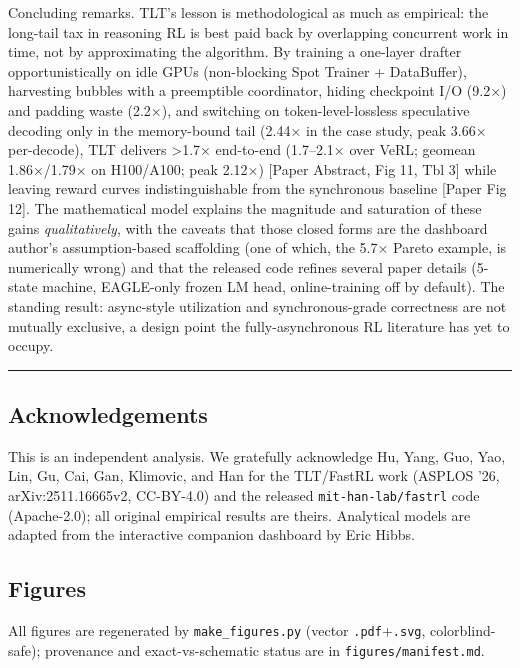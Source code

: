 \documentclass[
  11pt,
  letterpaper,
]{article}
\begin{document}
Concluding remarks. TLT's lesson is methodological as much as empirical:
the long-tail tax in reasoning RL is best paid back by overlapping
concurrent work in time, not by approximating the algorithm. By training
a one-layer drafter opportunistically on idle GPUs (non-blocking Spot
Trainer + DataBuffer), harvesting bubbles with a preemptible
coordinator, hiding checkpoint I/O (9.2×) and padding waste (2.2×), and
switching on token-level-lossless speculative decoding only in the
memory-bound tail (2.44× in the case study, peak 3.66× per-decode), TLT
delivers \textgreater1.7× end-to-end (1.7--2.1× over VeRL; geomean
1.86×/1.79× on H100/A100; peak 2.12×) {[}Paper Abstract, Fig 11, Tbl
3{]} while leaving reward curves indistinguishable from the synchronous
baseline {[}Paper Fig 12{]}. The mathematical model explains the
magnitude and saturation of these gains \emph{qualitatively}, with the
caveats that those closed forms are the dashboard author's
assumption-based scaffolding (one of which, the 5.7× Pareto example, is
numerically wrong) and that the released code refines several paper
details (5-state machine, EAGLE-only frozen LM head, online-training off
by default). The standing result: async-style utilization and
synchronous-grade correctness are not mutually exclusive, a design point
the fully-asynchronous RL literature has yet to occupy.

\begin{center}\rule{0.5\linewidth}{0.5pt}\end{center}

\subsection*{Acknowledgements}\label{acknowledgements}

This is an independent analysis. We gratefully acknowledge Hu, Yang,
Guo, Yao, Lin, Gu, Cai, Gan, Klimovic, and Han for the TLT/FastRL work
(ASPLOS '26, arXiv:2511.16665v2, CC-BY-4.0) and the released
\texttt{mit-han-lab/fastrl} code (Apache-2.0); all original empirical
results are theirs. Analytical models are adapted from the interactive
companion dashboard by Eric Hibbs.

\subsection*{Figures}\label{figures}

All figures are regenerated by \texttt{make\_figures.py} (vector
\texttt{.pdf}+\texttt{.svg}, colorblind-safe); provenance and
exact-vs-schematic status are in \texttt{figures/manifest.md}.
\end{document}
